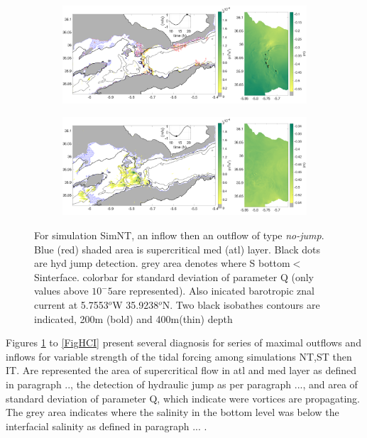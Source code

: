 \begin{figure}[!h]
 \centering
 
 \begin{subfigure}{\linewidth}
\centering
\includegraphics[width=1\linewidth]{./GBR3D/ME2_19h_p.png}
\end{subfigure}
 
 \begin{subfigure}{\linewidth}
\centering
\includegraphics[width=\linewidth]{./GBR3D/ME2_13h_p.png}
\end{subfigure}
\caption {For simulation SimNT, an inflow then an outflow of type \textit{no-jump}. Blue (red) shaded area is supercritical med (atl) layer. Black dots are hyd jump detection. grey area denotes where S bottom$<$Sinterface. colorbar for standard deviation of parameter Q (only values above $10^-5$are represented). Also inicated barotropic znal current at 5.7553$^o$W  35.9238$^o$N. Two black isobathes contours are indicated, 200m (bold) and 400m(thin) depth  }
\label{FigHCN}
\end{figure}

Figures \ref{FigHCN} to \ref{FigHCI} present several diagnosis for series of maximal outflows and inflows for variable strength of the tidal forcing among simulations NT,ST then IT. Are represented the area of supercritical flow in atl and med layer as defined in paragraph .., the detection of hydraulic jump as per paragraph ..., and area of standard deviation of parameter Q, which indicate were vortices are propagating. The grey area indicates where the salinity in the bottom level was below the interfacial salinity as defined in paragraph ... .

